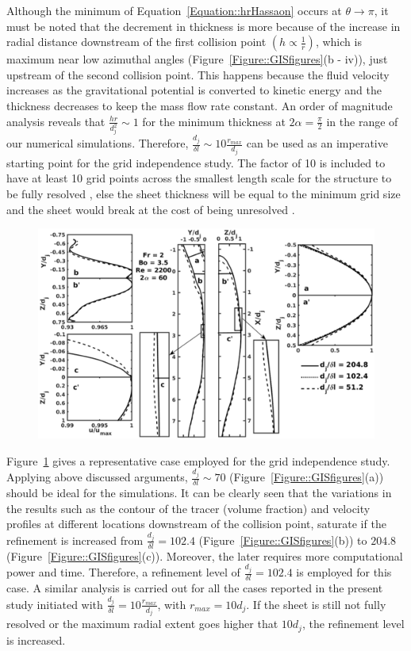 \documentclass[%
aip,
sd,%
amsmath,amssymb,
preprint,%
author-year,%
]{revtex4-1}
\begin{document}
Although the minimum of Equation~\ref{Equation::hrHassaon} occurs at $\theta \to \pi$, it must be noted that the decrement in thickness is more because of the increase in radial distance downstream of the first collision point $\left(h \propto \frac{1}{r}\right)$, which is maximum near low azimuthal angles (Figure~\ref{Figure::GISfigures}(b - iv)), just upstream of the second collision point. This happens because the fluid velocity increases as the gravitational potential is converted to kinetic energy and the thickness decreases to keep the mass flow rate constant. An order of magnitude analysis reveals that $\frac{hr}{d_j^2} \sim 1$ for the minimum thickness at $2\alpha = \frac{\pi}{2}$ in the range of our numerical simulations. Therefore, $\frac{d_j}{\delta l} \sim 10\frac{r_{max}}{d_j}$ can be used as an imperative starting point for the grid independence study. The factor of 10 is included to have at least 10 grid points across the smallest length scale for the structure to be fully resolved \citep{ling2015multiscale}, else the sheet thickness will be equal to the minimum grid size and the sheet would break at the cost of being unresolved \citep{chen2013high}.
\begin{figure}
	\centering
	\includegraphics[width=\linewidth]{gis}
	\caption{}
	\label{Figure::GISplots}
\end{figure}
Figure~\ref{Figure::GISplots} gives a representative case employed for the grid independence study. Applying above discussed arguments, $\frac{d_j}{\delta l} \sim 70$ (Figure~\ref{Figure::GISfigures}(a)) should be ideal for the simulations. It can be  clearly seen that the variations in the results such as the contour of the tracer (volume fraction) and velocity profiles at different locations downstream of the collision point, saturate if the refinement is increased from $\frac{d_j}{\delta l} = 102.4$ (Figure~\ref{Figure::GISfigures}(b)) to $204.8$ (Figure~\ref{Figure::GISfigures}(c)). Moreover, the later requires more computational power and time. Therefore, a refinement level of $\frac{d_j}{\delta l} = 102.4$ is employed for this case. A similar analysis is carried out for all the cases reported in the present study initiated with $\frac{d_j}{\delta l} = 10\frac{r_{max}}{d_j}$, with $r_{max} = 10d_j$. If the sheet is still not fully resolved or the maximum radial extent goes higher that $10d_j$, the refinement level is increased.\\
\end{document}
